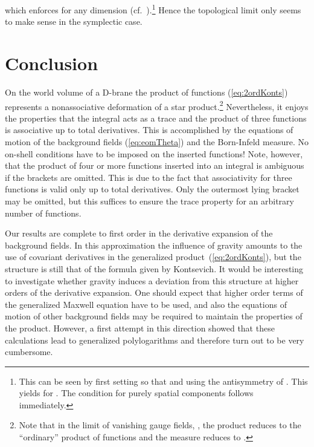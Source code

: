 \documentclass[a4paper,12pt]{article}
\providecommand {\cF} {{\cal F}}
\begin{document}
which enforces \coordHE{} for any dimension 
(cf.~\cite{Baulieu:2001fi}).\footnote{This can be seen by first setting 
\coordHE{} so that \coordHE{} and using the antisymmetry of \coordHE{}. 
This yields \coordHE{} for \coordHE{}. The condition for purely spatial
components follows immediately.} Hence the topological limit only seems to 
make sense in the symplectic case.


\section{Conclusion}
\label{sec:concl}

On the world volume of a D-brane the product of functions (\ref{eq:2ordKonts}) 
represents a nonassociative deformation of a star product.\footnote{Note that 
in the limit of vanishing gauge fields, 
\myHighlight{$\cF_{\mu\nu}\sim\epsilon\rightarrow 0$}\coordHE{}, the product reduces to the 
``ordinary'' product of functions and the measure reduces to \coordHE{}.} 
Nevertheless, it 
enjoys the properties that the integral acts as a trace and the product of 
three functions is associative up to total derivatives. This is accomplished 
by the equations of motion of the background fields (\ref{eq:eomTheta}) and 
the Born-Infeld measure. 
No on-shell conditions have to be imposed on the inserted functions! Note, 
however, that the product of four or more functions inserted into an integral 
is ambiguous if the brackets are omitted. This is due to the fact that 
associativity for three functions is valid only up to total derivatives. 
Only the outermost lying bracket may be omitted, but this suffices 
to ensure the trace property for an arbitrary number of functions. 

Our results are complete to first order in the derivative expansion of the
background fields. In this approximation the influence of gravity amounts to 
the use of covariant derivatives in the generalized 
product~(\ref{eq:2ordKonts}), but the structure is still that of the formula 
given by Kontsevich. It would be interesting to investigate whether gravity 
induces a deviation from this structure at higher orders of the derivative 
expansion. One should expect that higher order terms of the generalized 
Maxwell equation have to be used, and also the equations of motion of other
background fields may
be required to maintain the properties of the product. However, a first 
attempt in this direction showed that these calculations lead to generalized 
polylogarithms and therefore turn out to be very cumbersome.
\end{document}
